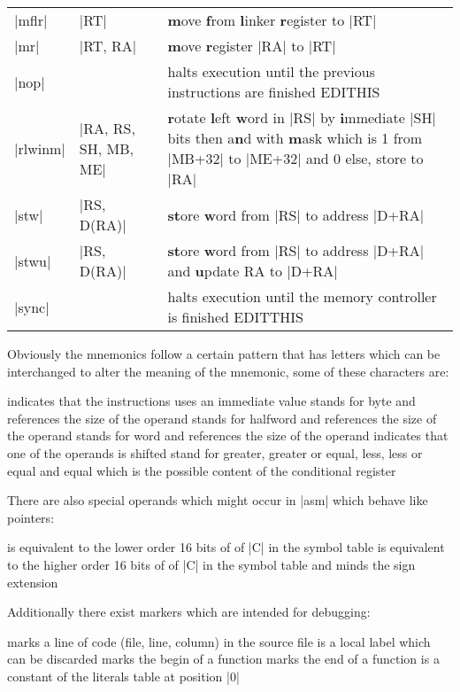 \begin{tabular}{l l p{9cm}}
    |mflr| & |RT| & \textbf{m}ove \textbf{f}rom \textbf{l}inker \textbf{r}egister to |RT|\\
    |mr| & |RT, RA| & \textbf{m}ove \textbf{r}egister |RA| to |RT| \\
    |nop| & & halts execution until the previous instructions are finished EDITHIS\\
    |rlwinm| & |RA, RS, SH, MB, ME| & \textbf{r}otate \textbf{l}eft \textbf{w}ord in |RS| by \textbf{i}mmediate |SH| bits then a\textbf{n}d with \textbf{m}ask which is 1 from |MB+32| to |ME+32| and 0 else, store to |RA|\\
    |stw| & |RS, D(RA)| & \textbf{st}ore \textbf{w}ord from |RS| to address |D+RA|\\
    |stwu| & |RS, D(RA)| & \textbf{st}ore \textbf{w}ord from |RS| to address |D+RA| and \textbf{u}pdate RA to |D+RA|\\
    |sync| & & halts execution until the memory controller is finished EDITTHIS\\
\end{tabular}

Obviously the mnemonics follow a certain pattern that has letters which can be interchanged to alter the meaning of the mnemonic, some of these characters are:
\begin{description}
     indicates that the instructions uses an immediate value
     stands for byte and references the size of the operand
     stands for halfword and references the size of the operand
     stands for word and references the size of the operand
     indicates that one of the operands is shifted
     stand for greater, greater or equal, less, less or equal and equal which is the possible content of the conditional register
\end{description}

There are also special operands which might occur in |asm| which behave like pointers:
\begin{description}
     is equivalent to the lower order 16 bits of of |C| in the symbol table
     is equivalent to the higher order 16 bits of of |C| in the symbol table and minds the sign extension
\end{description}

Additionally there exist markers which are intended for debugging:
\begin{description}
         marks a line of code (file, line, column) in the source file
         is a local label which can be discarded
         marks the begin of a function
         marks the end of a function
         is a constant of the literals table at position |0|
\end{description}

